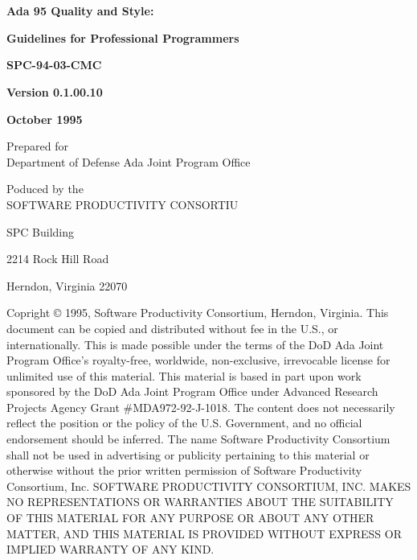 \chapter[英文原版的版权声明]{}
\pagestyle{empty}
\begin{center}
\textbf{\huge{Ada 95 Quality and Style:}}

\textbf{\large{Guidelines for Professional Programmers}}

\vfill
\textbf{\large{SPC-94-03-CMC}}

\vspace{2em}
\textbf{\large{Version 0.1.00.10}}

\vspace{2em}
\textbf{\large{October 1995}}

\vspace{2em}
\large{Prepared for\\
Department of Defense Ada Joint Program Office}

\vspace{2em}
Poduced by the\\
SOFTWARE PRODUCTIVITY CONSORTIU

\vspace{2em}
SPC Building

2214 Rock Hill Road

Herndon, Virginia 22070

\vspace{2em}

\end{center}

\vspace{2em}
\noindent
\footnotesize{
Copright \copyright{} 1995, Software Productivity Consortium, Herndon, Virginia.
This document can be copied and distributed without fee in the U.S., or
internationally. This is made possible under the terms of the DoD Ada Joint
Program Office's royalty-free, worldwide, non-exclusive, irrevocable license
for unlimited use of this material. This material is based in part upon work
sponsored by the DoD Ada Joint Program Office under Advanced Research Projects
Agency Grant \#MDA972-92-J-1018. The content does not necessarily reflect the position or the policy of the U.S. Government, and no official endorsement should
be inferred. The name Software Productivity Consortium shall not be used in
advertising or publicity pertaining to this material or otherwise without the
prior written permission of Software Productivity Consortium, Inc.
SOFTWARE PRODUCTIVITY CONSORTIUM, INC. MAKES NO REPRESENTATIONS OR WARRANTIES
ABOUT THE SUITABILITY OF THIS MATERIAL FOR ANY PURPOSE OR ABOUT ANY OTHER
MATTER, AND THIS MATERIAL IS PROVIDED WITHOUT EXPRESS OR IMPLIED WARRANTY OF
ANY KIND.}

